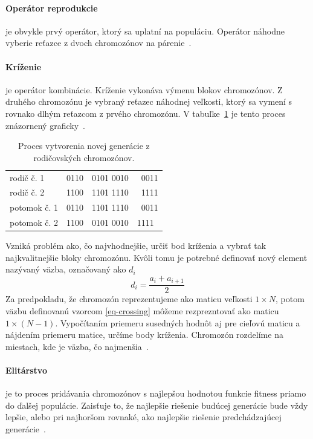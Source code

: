 \documentclass[a4paper,slovak,12pt,appendix]{article}
\begin{document}
\paragraph{Operátor reprodukcie} je obvykle prvý operátor, ktorý sa uplatní na
populáciu. Operátor náhodne vyberie reťazce z dvoch chromozónov na
párenie~\cite{Chavan2015}.

\paragraph{Kríženie} je operátor kombinácie. Kríženie vykonáva výmenu blokov
chromozónov. Z druhého chromozónu je vybraný reťazec náhodnej veľkosti, ktorý
sa vymení s rovnako dlhým reťazcom z prvého chromozónu.
V tabuľke~\ref{tab-crossing} je tento proces znázornený
graficky~\cite{Chavan2015}.

\begin{table}
  \centering
  \caption{Proces vytvorenia novej generácie z rodičovských chromozónov.}
  \label{tab-crossing}
  \begin{tabular}{p{4cm}l|l|l}
    rodič č. 1      &  0110 & 0101  0010 & 0011  \\
    rodič č. 2      &  1100 & 1101  1110 & 1111  \\
    \hline
    potomok č. 1    &  0110 & 1101  1110 & 0011  \\
    potomok č. 2    &  1100 & 0101  0010 & 1111  \\
  \end{tabular}
\end{table}

Vzniká problém ako, čo najvhodnejšie, určiť bod kríženia a vybrať tak
najkvalitnejšie bloky chromozónu. Kvôli tomu je potrebné definovať nový element
nazývaný väzba, označovaný ako $d_i$
\begin{equation}
  d_i = \frac{a_i + a_{i+1}}{2}
  \label{eq-crossing}
\end{equation}
Za predpokladu, že chromozón reprezentujeme ako maticu veľkosti $1 \times N$,
potom väzbu definovanú vzorcom \ref{eq-crossing} môžeme rezprezntovať ako
maticu $1 \times (N-1)$. Vypočítaním priemeru susedných hodnôt aj pre cieľovú
maticu a nájdením priemeru matice, určíme body kríženia. Chromozón rozdelíme na
miestach, kde je väzba, čo najmenšia~\cite{Simonova2007}.

\paragraph{Elitárstvo} je to proces pridávania chromozónov s najlepšou hodnotou
funkcie fitness priamo do ďalšej populácie. Zaisťuje to, že najlepšie riešenie
budúcej generácie bude vždy lepšie, alebo pri najhoršom rovnaké, ako najlepšie
riešenie predchádzajúcej generácie~\cite{Deolekar2016}.
\end{document}
